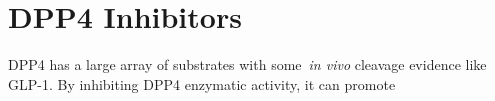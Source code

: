 \section{DPP4 Inhibitors}
DPP4 has a large array of substrates with some~\textit{in vivo} cleavage evidence like GLP-1. By inhibiting DPP4 enzymatic activity, it can promote 
